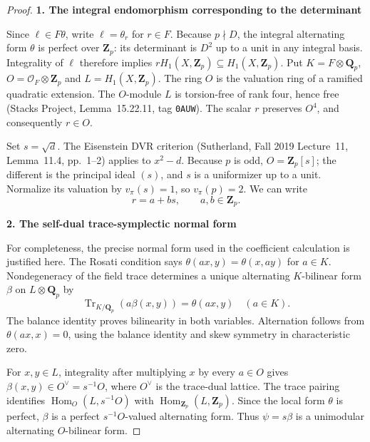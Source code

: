 \documentclass[11pt,a4paper]{article}
\theoremstyle{definition}
\begin{document}
\begin{proof}
\par\medskip\noindent\textbf{1. The integral endomorphism corresponding to the determinant}\quad 

Since \(\ell\in F\theta\), write \(\ell=\theta_r\) for \(r\in F\). Because \(p\nmid D\), the integral alternating form \(\theta\) is perfect over \(\mathbf Z_p\): its determinant is \(D^2\) up to a unit in any integral basis. Integrality of \(\ell\) therefore implies \(rH_1(X,\mathbf Z_p)\subseteq H_1(X,\mathbf Z_p)\). Put \(K=F\otimes\mathbf Q_p\), \(O=\mathcal O_F\otimes\mathbf Z_p\) and \(L=H_1(X,\mathbf Z_p)\). The ring \(O\) is the valuation ring of a ramified quadratic extension. The \(O\)-module \(L\) is torsion-free of rank four, hence free (Stacks Project, Lemma~15.22.11, tag \texttt{0AUW}). The scalar \(r\) preserves \(O^4\), and consequently \(r\in O\).

Set \(s=\sqrt d\). The Eisenstein DVR criterion (Sutherland, Fall 2019 Lecture~11, Lemma~11.4, pp.~1--2) applies to \(x^2-d\). Because \(p\) is odd, \(O=\mathbf Z_p[s]\); the different is the principal ideal \((s)\), and \(s\) is a uniformizer up to a unit. Normalize its valuation by \(v_\pi(s)=1\), so \(v_\pi(p)=2\). We can write \[
 r=a+bs,\qquad a,b\in\mathbf Z_p.
 \tag{S33.5}
\]

\par\medskip\noindent\textbf{2. The self-dual trace-symplectic normal form}\quad 

For completeness, the precise normal form used in the coefficient calculation is justified here. The Rosati condition says \(\theta(ax,y)=\theta(x,ay)\) for \(a\in K\). Nondegeneracy of the field trace determines a unique alternating \(K\)-bilinear form \(\beta\) on \(L\otimes\mathbf Q_p\) by \[
 \operatorname{Tr}_{K/\mathbf Q_p}(a\beta(x,y))=\theta(ax,y)
 \quad(a\in K).
\] The balance identity proves bilinearity in both variables. Alternation follows from \(\theta(ax,x)=0\), using the balance identity and skew symmetry in characteristic zero.

For \(x,y\in L\), integrality after multiplying \(x\) by every \(a\in O\) gives \(\beta(x,y)\in O^\vee=s^{-1}O\), where \(O^\vee\) is the trace-dual lattice. The trace pairing identifies \(\operatorname{Hom}_O(L,s^{-1}O)\) with \(\operatorname{Hom}_{\mathbf Z_p}(L,\mathbf Z_p)\). Since the local form \(\theta\) is perfect, \(\beta\) is a perfect \(s^{-1}O\)-valued alternating form. Thus \(\psi=s\beta\) is a unimodular alternating \(O\)-bilinear form.


\end{proof}
\end{document}
